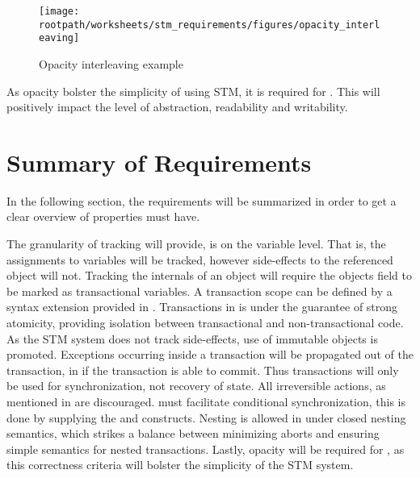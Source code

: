 \begin{figure}[htbp]
\centering
 \texttt{[image: \\rootpath/worksheets/stm\_requirements/figures/opacity\_interleaving]} 
 \caption{Opacity interleaving example}
\label{fig:opacity_interleaving}
\end{figure}

As opacity bolster the simplicity of using \ac{STM}, it is required for \stmname. This will positively impact the level of abstraction, readability and writability.

\section{Summary of Requirements}\label{sec:sum_of_req}
In the following section, the requirements will be summarized in order to get a clear overview of properties \stmnamesp must have. 

The granularity of tracking \stmnamesp will provide, is on the variable level. That is, the assignments to variables will be tracked, however side-effects to the referenced object will not. Tracking the internals of an object will require the objects field to be marked as transactional variables. A transaction scope can be defined by a syntax extension provided in \stmname. Transactions in \stmnamesp is under the guarantee of strong atomicity, providing isolation between transactional and non-transactional code. As the \ac{STM} system does not track side-effects, use of immutable objects is promoted. Exceptions occurring inside a transaction will be propagated out of the transaction, in if the transaction is able to commit. Thus transactions will only be used for synchronization, not recovery of state. All irreversible actions, as mentioned in  are discouraged. \stmnamesp must facilitate conditional synchronization, this is done by supplying the  and  constructs. Nesting is allowed in \stmnamesp under closed nesting semantics, which strikes a balance between minimizing aborts and ensuring simple semantics for nested transactions. Lastly, opacity will be required for \stmname, as this correctness criteria will bolster the simplicity of the \ac{STM} system.
\worksheetend